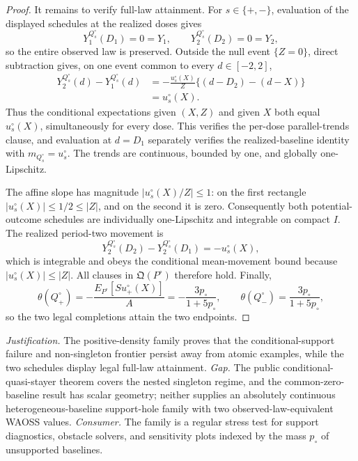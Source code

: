 \documentclass{article}
\begin{document}
\begin{proof}
It remains to verify full-law attainment.  For \(s\in\{+,-\}\), evaluation of the displayed schedules at the realized doses gives
\[
 Y_1^{Q_s^{\circ}}(D_1)=0=Y_1,
 \qquad
 Y_2^{Q_s^{\circ}}(D_2)=0=Y_2,
\]
so the entire observed law is preserved.  Outside the null event \(\{Z=0\}\), direct subtraction gives, on one event common to every \(d\in[-2,2]\),
\[
 \begin{aligned}
 Y_2^{Q_s^{\circ}}(d)-Y_1^{Q_s^{\circ}}(d)
 &=-\frac{u_s^{\circ}(X)}Z\{(d-D_2)-(d-X)\}\\
 &=u_s^{\circ}(X).
 \end{aligned}
\]
Thus the conditional expectations given \((X,Z)\) and given \(X\) both equal \(u_s^{\circ}(X)\), simultaneously for every dose.  This verifies the per-dose parallel-trends clause, and evaluation at \(d=D_1\) separately verifies the realized-baseline identity with \(m_{Q_s^{\circ}}=u_s^{\circ}\).  The trends are continuous, bounded by one, and globally one-Lipschitz.

The affine slope has magnitude \(|u_s^{\circ}(X)/Z|\leq1\): on the first rectangle \(|u_s^{\circ}(X)|\leq1/2\leq|Z|\), and on the second it is zero.  Consequently both potential-outcome schedules are individually one-Lipschitz and integrable on compact \(I\).  The realized period-two movement is
\[
 Y_2^{Q_s^{\circ}}(D_2)-Y_2^{Q_s^{\circ}}(D_1)=-u_s^{\circ}(X),
\]
which is integrable and obeys the conditional mean-movement bound because \(|u_s^{\circ}(X)|\leq|Z|\).  All clauses in \(\mathfrak Q(P^{\circ})\) therefore hold.  Finally,
\[
 \theta(Q_+^{\circ})
 =-\frac{E_{P^{\circ}}[Su_+^{\circ}(X)]}{A}
 =-\frac{3p_{\circ}}{1+5p_{\circ}},
 \qquad
 \theta(Q_-^{\circ})
 =\frac{3p_{\circ}}{1+5p_{\circ}},
\]
so the two legal completions attain the two endpoints.
\end{proof}
\par\smallskip\noindent \textit{Justification.} The positive-density family proves that the conditional-support failure and non-singleton frontier persist away from atomic examples, while the two schedules display legal full-law attainment. \textit{Gap.} The public conditional-quasi-stayer theorem covers the nested singleton regime, and the common-zero-baseline result has scalar geometry; neither supplies an absolutely continuous heterogeneous-baseline support-hole family with two observed-law-equivalent WAOSS values. \textit{Consumer.} The family is a regular stress test for support diagnostics, obstacle solvers, and sensitivity plots indexed by the mass \(p_{\circ}\) of unsupported baselines.
\end{document}
